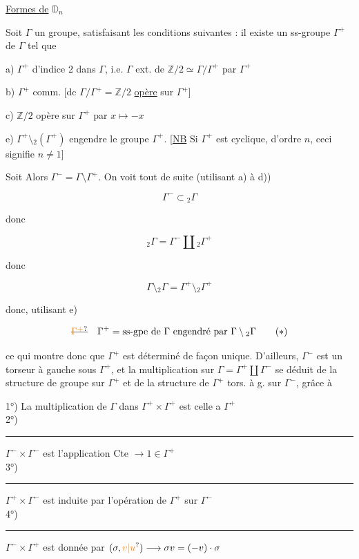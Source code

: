 \uline{Formes de} $\mathbb D_n$

Soit $\Gamma$ un groupe,  satisfaisant les conditions
suivantes : il existe un ss-groupe $\Gamma^+$ de $\Gamma$ tel que

a) $\Gamma^+$ d'indice 2 dans $\Gamma$, i.e. $\Gamma$ ext. de $\mathbb Z/2\simeq\Gamma/\Gamma^+$
par $\Gamma^+$

b) $\Gamma^+$  comm. [dc $\Gamma/\Gamma^+=\mathbb Z/2$ \uline{opère} sur $\Gamma^+$]

c) $\mathbb Z/2$ opère sur $\Gamma^+$ par $x\mapsto-x$


e) $\Gamma^+\setminus{}_2(\Gamma^+)$ engendre le groupe $\Gamma^+$. [\uline{NB} Si $\Gamma^+$ est
cyclique,  d'ordre $n$, ceci signifie $n\ne1$]


 Soit Alors $\Gamma^-=\Gamma\setminus\Gamma^+$. On voit tout de
suite  (utilisant a) à d))

\[
\Gamma^-\subset{}_2\Gamma
\]

donc

\[
{}_2\Gamma=\Gamma^-\amalg{}_2\Gamma^+
\]

donc

\[
\Gamma\setminus{}_2\Gamma=\Gamma^+\setminus{}_2\Gamma^+
\]

donc, utilisant e)

\[
\deleted{\unsure{\Gamma^+}}\quad\Gamma^+=\text{ss-gpe de }\Gamma\text{ engendré par }\Gamma\setminus{}_2\Gamma\tag*{$(*)$}
\]

ce qui montre donc que $\Gamma^+$ est déterminé
de façon unique. D'ailleurs, $\Gamma^-$ est un torseur
à gauche sous $\Gamma^+$, et la multiplication sur
$\Gamma=\Gamma^+\amalg\Gamma^-$ se déduit de la structure de
groupe sur $\Gamma^+$ et de la structure de $\Gamma^+$ tors.
à g. sur $\Gamma^-$, grâce à

1°) La multiplication de $\Gamma$ dans $\Gamma^+\times\Gamma^+$ est celle a $\Gamma^+$\\ 
2°) \rule{4em}{.25pt} $\Gamma^-\times\Gamma^-$ est l'application Cte $\longrightarrow1\in\Gamma^+$\\ 
3°) \rule{3em}{.25pt} $\Gamma^+\times\Gamma^-$ est induite par l'opération de $\Gamma^+$ sur $\Gamma^-$\\ 
4°) \rule{3em}{.25pt} $\Gamma^-\times\Gamma^+$ est donnée par $(\sigma,\unsure{v|u})\longrightarrow\sigma v=(-v)\cdot\sigma$

